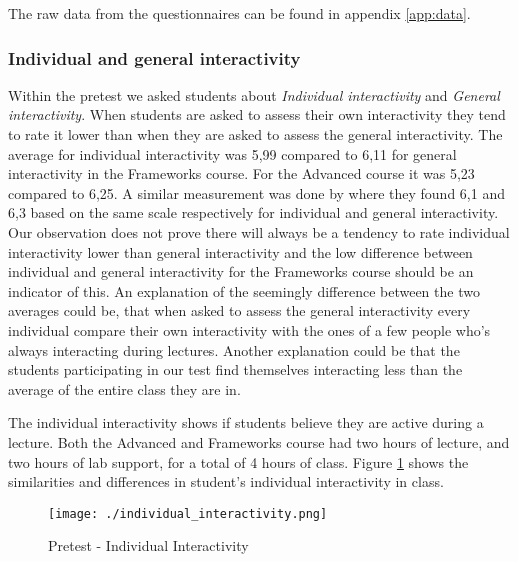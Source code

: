 The raw data from the questionnaires can be found in appendix \ref{app:data}.

\subsubsection*{Individual and general interactivity}

Within the pretest we asked students about \emph{Individual interactivity} and \emph{General interactivity}. When students are asked to assess their own interactivity they tend to rate it lower than when they are asked to assess the general interactivity. The average for individual interactivity was 5,99 compared to 6,11 for general interactivity in the Frameworks course. For the Advanced course it was 5,23 compared to 6,25. A similar measurement was done by  where they found 6,1 and 6,3 based on the same scale respectively for individual and general interactivity. Our observation does not prove there will always be a tendency to rate individual interactivity lower than general interactivity and the low difference between individual and general interactivity for the Frameworks course should be an indicator of this. An explanation of the seemingly difference between the two averages could be, that when asked to assess the general interactivity every individual compare their own interactivity with the ones of a few people who's always interacting during lectures. Another explanation could be that the students participating in our test find themselves interacting less than the average of the entire class they are in.


The individual interactivity shows if students believe they are active during a lecture. Both the Advanced and Frameworks course had two hours of lecture, and two hours of lab support, for a total of 4 hours of class. Figure \ref{fig:individual_interactivity} shows the similarities and differences in student's individual interactivity in class. 

 \begin{figure}[H]
  \centering
     \texttt{[image: ./individual\_interactivity.png]}
     \caption{Pretest - Individual Interactivity}
     \label{fig:individual_interactivity}
 \end{figure}

